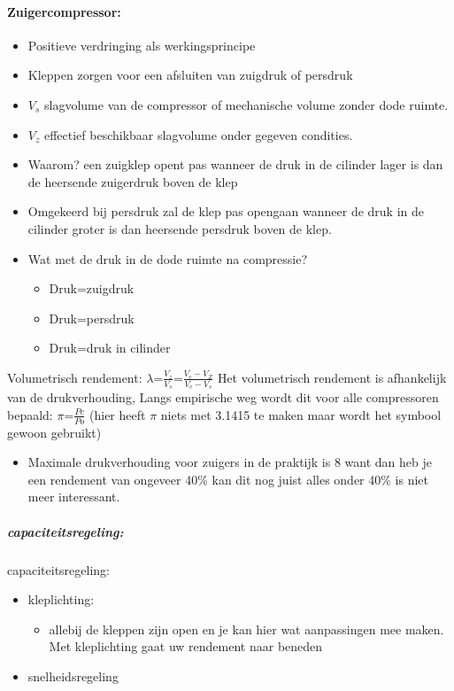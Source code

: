 \documentclass[12pt]{article}
\begin{document}
\paragraph{Zuigercompressor:}
\begin{itemize}
    \item Positieve verdringing als werkingsprincipe 
    \item Kleppen zorgen voor een afsluiten van zuigdruk of persdruk 
    \item $V_s$ slagvolume van de compressor of mechanische volume zonder dode ruimte.
    \item $V_z$ effectief beschikbaar slagvolume onder gegeven condities.
    \item Waarom? een zuigklep opent pas wanneer de druk in de cilinder lager is dan de heersende zuigerdruk boven de klep
    \item Omgekeerd bij persdruk zal de klep pas opengaan wanneer de druk in de cilinder groter is dan heersende persdruk boven de klep.
    \item Wat met de druk in de dode ruimte na compressie?\begin{itemize}
        \item Druk=zuigdruk
        \item Druk=persdruk
        \item Druk=druk in cilinder
    \end{itemize}
\end{itemize}
Volumetrisch rendement: $\lambda$=$\frac{V_z}{V_s}$=$\frac{V_c-V_Z}{V_c-V_s}$
Het volumetrisch rendement is afhankelijk van de drukverhouding, Langs empirische weg wordt dit voor alle compressoren bepaald: $\pi$=$\frac{Pc}{Po}$ (hier heeft $\pi$ niets met 3.1415 te maken maar wordt het symbool gewoon gebruikt)
\begin{itemize}
    \item[] Maximale drukverhouding voor zuigers in de praktijk is 8 want dan heb je een rendement van ongeveer 40\% kan dit nog juist alles onder 40\% is niet meer interessant.
\end{itemize}
\subparagraph{capaciteitsregeling:}
capaciteitsregeling:\begin{itemize}
    \item kleplichting:\begin{itemize}
        \item allebij de kleppen zijn open en je kan hier wat aanpassingen mee maken. Met kleplichting gaat uw rendement naar beneden
    \end{itemize}
    \item snelheidsregeling
\end{itemize}
\end{document}
